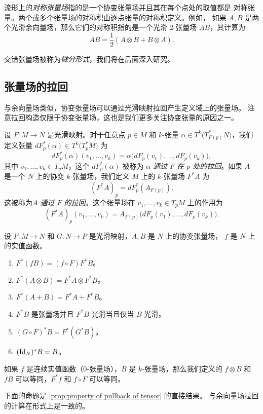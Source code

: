 流形上的\emph{对称张量场}指的是一个协变张量场并且其在每个点处的取值都是
对称张量。两个或多个张量场的对称积由逐点张量的对称积定义。例如，
如果 $A,B$ 是两个光滑余向量场，那么它们的对称积指的是一个光滑 $2$-张量场
$AB$，其计算为
\[
  AB=\frac{1}{2}(A\otimes B+B\otimes A).  
\]

交错张量场被称为\emph{微分形式}，我们将在后面深入研究。


\subsection{张量场的拉回}

与余向量场类似，协变张量场可以通过光滑映射拉回产生定义域上的张量场。
注意拉回构造仅限于协变张量场，这也是我们更多关注协变张量的原因之一。

设 $F:M\to N$ 是光滑映射。对于任意点 $p\in M$ 和 $k$-张量
$\alpha\in T^k\bigl(T_{F(p)}^*N\bigr)$，我们定义张量
$dF_p^*(\alpha)\in T^k\bigl(T_p^*M\bigr)$ 为
\[
  dF_p^*(\alpha)(v_1,\dots,v_k)=\alpha\bigl(dF_p(v_1),\dots,dF_p(v_k)\bigr)  ,
\]
其中 $v_1,\dots,v_k\in T_pM$，这个 $dF_p^*(\alpha)$ 被称为
\emph{$\alpha$ 通过 $F$ 在 $p$ 处的拉回}。如果 $A$ 是一个
$N$ 上的协变 $k$-张量场，我们定义 $M$ 上的 $k$-张量场
$F^*A$ 为
\[
  (F^*A)  _p=dF_p^*(A_{F(p)}).
\]
这被称为\emph{$A$ 通过 $F$ 的拉回}。这个张量场在
$v_1,\dots,v_k\in T_pM$ 上的作用为
\[
  (F^*A)  _p(v_1,\dots,v_k)=A_{F(p)}\bigl(dF_p(v_1),\dots,dF_p(v_k)\bigr).
\]

\begin{proposition}[拉回张量的性质]\label{prop:property of pullback of tensor}
  设 $F:M\to N$ 和 $G:N\to P$ 是光滑映射，$A,B$ 是 $N$ 上的协变张量场，
  $f$ 是 $N$ 上的实值函数。
  \begin{enumerate}
    \item $F^*(fB)=(f\circ F)F^*B$。
    \item $F^*(A\otimes B)=F^*A\otimes F^*B$。
    \item $F^*(A+B)=F^*A+F^*B$。
    \item $F^*B$ 是张量场并且 $F^*B$ 光滑当且仅当 $B$ 光滑。
    \item $(G\circ F)^*B=F^*(G^*B)$。
    \item $(\operatorname{Id}_N)^*B=B$。
  \end{enumerate}
\end{proposition}
 
如果 $f$ 是连续实值函数（$0$-张量场），$B$ 是 $k$-张量场，那么我们定义的
$f\otimes B$ 和 $fB$ 可以等同，$F^*f$ 和 $f\circ F$ 可以等同。

下面的命题是 \autoref{prop:property of pullback of tensor} 的直接结果。
与余向量场拉回的计算在形式上是一致的。


